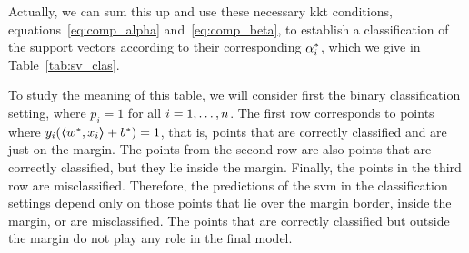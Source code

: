 %
Actually, we can sum this up and use these necessary \acrshort{kkt} conditions, equations~\eqref{eq:comp_alpha} and~\eqref{eq:comp_beta}, to establish a classification of the support vectors according to their corresponding $\opt{\alpha}_i$, which we give in Table~\ref{tab:sv_clas}.
%
\begin{table}[t!]
    \caption{Classification of the vectors in terms of the value of $\opt{\alpha}_i$. The first three rows illustrate the support vectors, while the last one illustrates those instances that are not support vectors.}
    \label{tab:sv_clas}
    \centering
\end{table}
%
To study the meaning of this table, we will consider first the binary classification setting, where $p_i=1$ for all $i=1, \ldots, n$. The first row corresponds to points where $y_i (\bm{\left\langle} {w}^*, x_i \bm{\right\rangle} + {b}^*) = 1$, that is, points that are correctly classified and are just on the margin. The points from the second row are also points that are correctly classified, but they lie inside the margin. Finally, the points in the third row are misclassified.
Therefore, the predictions of the \acrshort{svm} in the classification settings depend only on those points that lie over the margin border, inside the margin, or are misclassified. The points that are correctly classified but outside the margin do not play any role in the final model.
%

